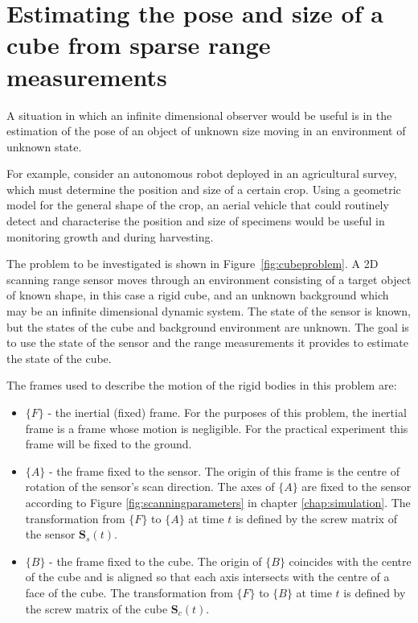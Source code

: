 \section{Estimating the pose and size of a cube from sparse range measurements}

A situation in which an infinite dimensional observer would be useful is in the estimation of the pose of an object of unknown size moving in an environment of unknown state.

For example, consider an autonomous robot deployed in an agricultural survey, which must determine the position and size of a certain crop. Using a geometric model for the general shape of the crop, an aerial vehicle that could routinely detect and characterise the position and size of specimens would be useful in monitoring growth and during harvesting.

The problem to be investigated is shown in Figure~\ref{fig:cubeproblem}. A 2D scanning range sensor moves through an environment consisting of a target object of known shape, in this case a rigid cube, and an unknown background which may be an infinite dimensional dynamic system. The state of the sensor is known, but the states of the cube and background environment are unknown. The goal is to use the state of the sensor and the range measurements it provides to estimate the state of the cube.

The frames used to describe the motion of the rigid bodies in this problem are:
\begin{itemize}
\item $\{F\}$ - the inertial (fixed) frame. For the purposes of this problem, the inertial frame is a frame whose motion is negligible. For the practical experiment this frame will be fixed to the ground.
\item $\{A\}$ - the frame fixed to the sensor. The origin of this frame is the centre of rotation of the sensor's scan direction. The axes of $\{A\}$ are fixed to the sensor according to Figure \ref{fig:scanningparameters} in chapter \ref{chap:simulation}. The transformation from $\{F\}$ to $\{A\}$ at time $t$ is defined by the screw matrix of the sensor $\mathbf{S}_{s}(t)$.
\item $\{B\}$ - the frame fixed to the cube. The origin of $\{B\}$ coincides with the centre of the cube and is aligned so that each axis intersects with the centre of a face of the cube. The transformation from $\{F\}$ to $\{B\}$ at time $t$ is defined by the screw matrix of the cube $\mathbf{S}_{c}(t)$.
\end{itemize} 


